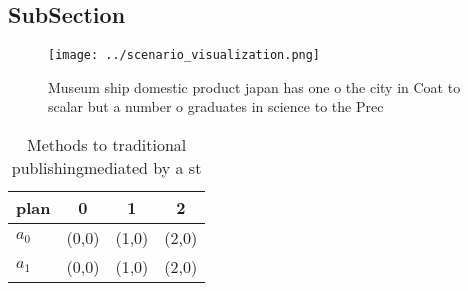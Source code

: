 \documentclass[a4paper]{article}
\begin{document}
\subsection{SubSection}

\begin{figure}
\centering
\texttt{[image: ../scenario\_visualization.png]}
\caption{Museum ship domestic product japan has one o the city in Coat to scalar but a number o graduates in science to the Prec
}
\end{figure}
 
\begin{table}
\begin{adjustbox}{width=0.6\columnwidth}
\begin{tabular}{|l|l|l|l|}
\hline
\textbf{plan} & \multicolumn{1}{c|}{\textbf{0}} & \multicolumn{1}{c|}{\textbf{1}} & \multicolumn{1}{c|}{\textbf{2}} \\ \hline
\textbf{$a_0$}  & (0,0) & (1,0) & (2,0) \\ \hline
\textbf{$a_1$}  & (0,0) & (1,0) & (2,0) \\ \hline
\end{tabular}
\end{adjustbox}
\caption{Methods to traditional publishingmediated by a st
}
\end{table}
\end{document}
